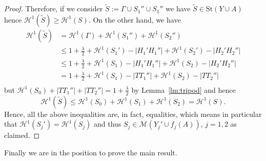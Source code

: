 \documentclass{amsart}
\renewcommand{\H}{\mathcal H}
\newcommand{\abs}[1]{\left\vert #1 \right\vert}
\newcommand{\St}{\mathrm{St}}
\newcommand{\M}{\mathcal{M}}
\renewcommand{\H}{\mathcal{H}}
\theoremstyle{definition}
\theoremstyle{remark}
\begin{document}
\begin{proof}
  Therefore, if we consider $\tilde S := \Gamma \cup S_1''\cup S_1''$ 
  we have $\tilde S\in \St(Y\cup A)$ hence $\H^1(\tilde S)\ge \H^1(S)$.
  On the other hand, we have 
  \begin{align*}
    \H^1(\tilde S) 
    &= \H^1(\Gamma) + \H^1(S_1'') + \H^1(S_2'') \\
    &\le 1 + \frac{\lambda}{2} 
      + \H^1(S_1') - \abs{H_1' H_1''}
      + \H^1(S_2') - \abs{H_2' H_2''} \\
      &\le 1 + \frac \lambda 2 + \H^1(S_1) - \abs{H_1' H_1''} + \H^1(S_2) - \abs{H_2' H_2''}\\
      &= 1  + \frac \lambda 2 + \H^1(S_1) - \abs{T T_1''} + \H^1(S_2) - \abs{T T_2''}\\
    \end{align*}
    but $\H^1(S_0)+\abs{T T_1''}+\abs{T T_2''} = 1+\frac \lambda 2$
    by Lemma~\ref{lm:tripod}
    and hence
    \[
      \H^1(\tilde S) 
      \le \H^1(S_0) + \H^1(S_1) + \H^1(S_2)
      = \H^1(S).
    \]
  Hence, all the above inequalities are, in fact, equalities,
  which means in particular that $\H^1(S_j')=\H^1(S_j)$
  and thus $S_j \in \M(Y_j'\cup f_j(A))$, $j=1,2$ as claimed.
\end{proof}


Finally we are in the position to prove the main result.
\end{document}
